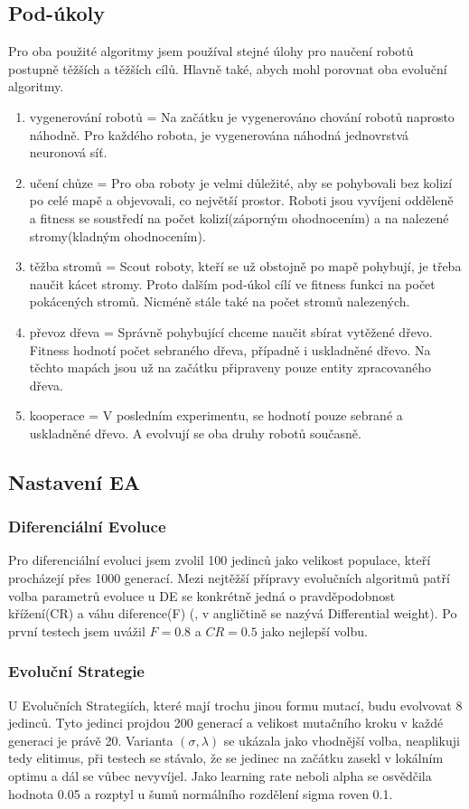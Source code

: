 \subsection{Pod-úkoly} 
Pro oba použité algoritmy jsem používal stejné úlohy pro naučení robotů postupně těžších a těžších cílů. Hlavně také, abych mohl porovnat oba evoluční algoritmy.  
\begin{enumerate}
        \item vygenerování robotů = Na začátku je vygenerováno chování robotů naprosto náhodně. Pro každého robota, je vygenerována náhodná jednovrstvá neuronová síť. 
        \item učení chůze = Pro oba roboty je velmi důležité, aby se pohybovali bez kolizí po celé mapě a objevovali, co největší prostor. Roboti jsou vyvíjeni odděleně a fitness se soustředí na počet kolizí(záporným ohodnocením) a na nalezené stromy(kladným ohodnocením).
        \item těžba stromů = Scout roboty, kteří se už obstojně po mapě pohybují, je třeba naučit kácet stromy. Proto dalším pod-úkol cílí ve fitness funkci na počet pokácených stromů. Nicméně stále také na počet stromů nalezených. 
        \item převoz dřeva = Správně pohybující chceme naučit sbírat vytěžené dřevo. Fitness hodnotí počet sebraného dřeva, případně i uskladněné dřevo. Na těchto mapách jsou už na začátku připraveny pouze entity zpracovaného dřeva.
        \item kooperace = V posledním experimentu, se hodnotí pouze sebrané a uskladněné dřevo. A evolvují se oba druhy robotů současně. 
\end{enumerate}

\subsection{Nastavení EA}
\subsubsection{Diferenciální Evoluce}
Pro diferenciální evoluci jsem zvolil 100 jedinců jako velikost populace, kteří procházejí přes 1000 generací. Mezi nejtěžší přípravy evolučních algoritmů patří volba parametrů evoluce u DE se konkrétně jedná o pravděpodobnost křížení(CR) a váhu diference(F) (, v angličtině se nazývá Differential weight). Po první testech jsem uvážil $F = 0.8 $ a $CR = 0.5$ jako nejlepší volbu. 
\subsubsection{Evoluční Strategie}
U Evolučních Strategiích, které mají trochu jinou formu mutací, budu evolvovat 8 jedinců. Tyto jedinci projdou 200 generací a velikost mutačního kroku  v každé generaci je právě 20. Varianta $(\sigma,\lambda)$ se ukázala jako vhodnější volba, neaplikuji tedy elitimus, při testech se stávalo, že se jedinec na začátku zasekl v lokálním optimu a dál se vůbec nevyvíjel. Jako learning rate neboli alpha se osvědčila hodnota 0.05 a rozptyl u šumů normálního rozdělení sigma roven 0.1.
